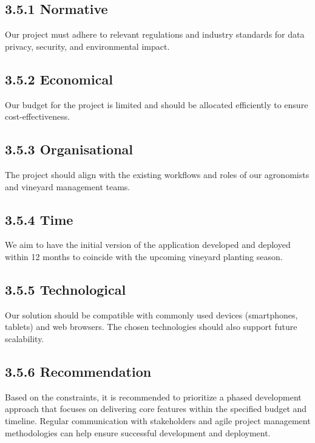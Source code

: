 \subsection{3.5.1 Normative}
Our project must adhere to relevant regulations and industry standards for data privacy, security, and environmental impact.

\subsection{3.5.2 Economical}
Our budget for the project is limited and should be allocated efficiently to ensure cost-effectiveness.

\subsection{3.5.3 Organisational}
The project should align with the existing workflows and roles of our agronomists and vineyard management teams.

\subsection{3.5.4 Time}
We aim to have the initial version of the application developed and deployed within 12 months to coincide with the upcoming vineyard planting season.

\subsection{3.5.5 Technological}
Our solution should be compatible with commonly used devices (smartphones, tablets) and web browsers. The chosen technologies should also support future scalability.

\subsection{3.5.6 Recommendation}
Based on the constraints, it is recommended to prioritize a phased development approach that focuses on delivering core features within the specified budget and timeline. Regular communication with stakeholders and agile project management methodologies can help ensure successful development and deployment.

